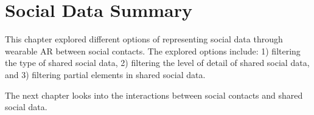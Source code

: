 \section{Social Data Summary}

This chapter explored different options of representing social data through wearable AR between social contacts. The explored options include: 1) filtering the type of shared social data, 2) filtering the level of detail of shared social data, and 3) filtering partial elements in shared social data. 

The next chapter looks into the interactions between social contacts and shared social data. 